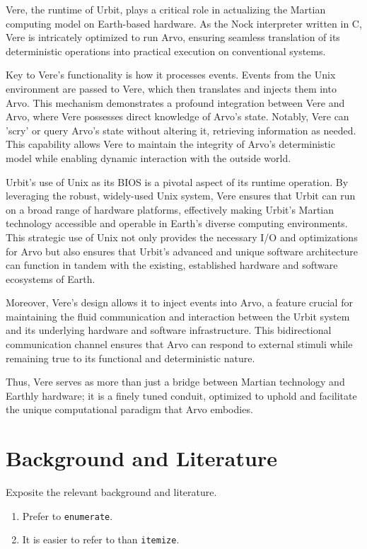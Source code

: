 \documentclass[twoside]{article}
\begin{document}
Vere, the runtime of Urbit, plays a critical role in actualizing the Martian computing model on Earth-based hardware. As the Nock interpreter written in C, Vere is intricately optimized to run Arvo, ensuring seamless translation of its deterministic operations into practical execution on conventional systems.

Key to Vere's functionality is how it processes events. Events from the Unix environment are passed to Vere, which then translates and injects them into Arvo. This mechanism demonstrates a profound integration between Vere and Arvo, where Vere possesses direct knowledge of Arvo's state. Notably, Vere can 'scry' or query Arvo's state without altering it, retrieving information as needed. This capability allows Vere to maintain the integrity of Arvo's deterministic model while enabling dynamic interaction with the outside world.

Urbit's use of Unix as its BIOS is a pivotal aspect of its runtime operation. By leveraging the robust, widely-used Unix system, Vere ensures that Urbit can run on a broad range of hardware platforms, effectively making Urbit's Martian technology accessible and operable in Earth's diverse computing environments. This strategic use of Unix not only provides the necessary I/O and optimizations for Arvo but also ensures that Urbit's advanced and unique software architecture can function in tandem with the existing, established hardware and software ecosystems of Earth.

Moreover, Vere's design allows it to inject events into Arvo, a feature crucial for maintaining the fluid communication and interaction between the Urbit system and its underlying hardware and software infrastructure. This bidirectional communication channel ensures that Arvo can respond to external stimuli while remaining true to its functional and deterministic nature. 

Thus, Vere serves as more than just a bridge between Martian technology and Earthly hardware; it is a finely tuned conduit, optimized to uphold and facilitate the unique computational paradigm that Arvo embodies.



\section{Background and Literature}

Exposite the relevant background and literature.

\begin{enumerate}
  \item  Prefer to \texttt{enumerate}.
  \item  It is easier to refer to than \texttt{itemize}.
\end{enumerate}
\end{document}

